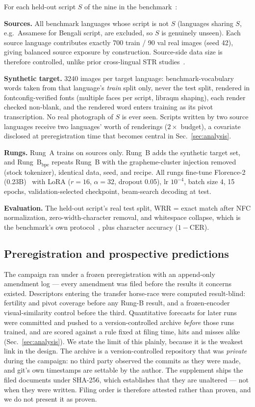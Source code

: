 For each held-out script $S$ of the nine in the benchmark~\cite{bstd}:

\noindent\textbf{Sources.} All benchmark languages whose script is not $S$ (languages sharing
$S$, e.g.\ Assamese for Bengali script, are excluded, so $S$ is genuinely unseen). Each source
language contributes exactly 700 train / 90 val real images (seed 42), giving balanced source
exposure by construction. Source-side data size is therefore controlled, unlike prior
cross-lingual STR studies~\cite{crosslingstr}.

\noindent\textbf{Synthetic target.} 3240 images per target language: benchmark-vocabulary
words taken from that language's \emph{train} split only, never the test split, rendered in
fontconfig-verified fonts (multiple faces per script, libraqm shaping), each
render checked non-blank, and the rendered word enters training as its pivot transcription. No real
photograph of $S$ is ever seen. Scripts written by two source languages receive two languages'
worth of renderings ($2\times$ budget), a covariate disclosed at preregistration time that
becomes central in Sec.~\ref{sec:analysis}.

\noindent\textbf{Rungs.} Rung~A trains on sources only. Rung~B adds the synthetic target set, and
Rung~B$_{\mathrm{bpe}}$ repeats Rung~B with the grapheme-cluster injection removed (stock
tokenizer), identical data, seed, and recipe. All rungs fine-tune Florence-2
(0.23B)~\cite{florence2} with LoRA ($r\!=\!16$, $\alpha\!=\!32$, dropout 0.05), lr $10^{-4}$,
batch size 4, 15 epochs, validation-selected checkpoint, beam-search decoding at test.

\noindent\textbf{Evaluation.} The held-out script's real test split, WRR = exact match after NFC
normalization, zero-width-character removal, and whitespace collapse, which is the benchmark's own
protocol~\cite{bstd,indicstr12}, plus character accuracy ($1-\mathrm{CER}$).

\subsection{Preregistration and prospective predictions}
\label{sec:prereg}

The campaign ran under a frozen preregistration with an append-only amendment log --- every
amendment was filed before the results it concerns existed. Descriptors entering the transfer
horse-race were computed result-blind: fertility and pivot coverage before any Rung-B result, and
a frozen-encoder visual-similarity control before the third. Quantitative forecasts for later
runs were committed and pushed to a version-controlled archive \emph{before} those runs trained,
and are scored against a rule fixed at filing time, hits and misses alike
(Sec.~\ref{sec:analysis}). We state the limit of this plainly, because it is the weakest link in
the design. The archive is a version-controlled repository that was \emph{private} during the
campaign: no third party observed the commits as they were made, and git's own timestamps are
settable by the author. The supplement ships the filed documents under SHA-256, which establishes
that they are unaltered --- not when they were written. Filing order is therefore attested rather
than proven, and we do not present it as proven.

